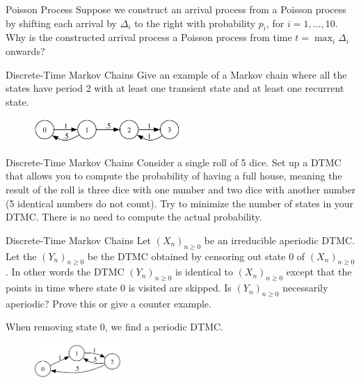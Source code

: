 \begin{problem}{Poisson Process}
Suppose we construct an arrival process from a Poisson process by shifting each arrival by $\Delta_i$ to the right with probability $p_i$, for $i = 1, \ldots, 10$. Why is the constructed arrival process a Poisson process from time $t = \max_i \Delta_i$ onwards?
\end{problem}

\begin{problem}{Discrete-Time Markov Chains}
Give an example of a Markov chain where all the states have period 2 with at least one transient state and at least one recurrent state.
\end{problem}

\begin{solution}
  \begin{figure}[h!]
    \begin{center}
      \includegraphics[width=0.5\textwidth]{img/24.2.png}
    \end{center}
  \end{figure}
\end{solution}

\begin{problem}{Discrete-Time Markov Chains}
Consider a single roll of 5 dice. Set up a DTMC that allows you to compute the probability of having a full house, meaning the result of the roll is three dice with one number and two dice with another number (5 identical numbers do not count). Try to minimize the number of states in your DTMC. There is no need to compute the actual probability.
\end{problem}
\begin{problem}{Discrete-Time Markov Chains}
  Let $(X_n)_{n\geq 0}$ be an irreducible aperiodic DTMC. Let the $(Y_n)_{n\geq0}$ be the DTMC obtained by censoring out state 0 of $(X_n)_{n\geq 0}$. In other words the DTMC $(Y_n)_{n\geq0}$ is identical to $(X_n)_{n\geq0}$ except that the points in time where state 0 is visited are skipped. Is $(Y_n)_{n\geq0}$ necessarily aperiodic? Prove this or give a counter example.
\end{problem}
\begin{solution}
  When removing state 0, we find a periodic DTMC.

  \begin{figure}[h!]
    \begin{center}
      \includegraphics[width=0.3\textwidth]{img/24.4.png}
    \end{center}
  \end{figure}
  
\end{solution}

